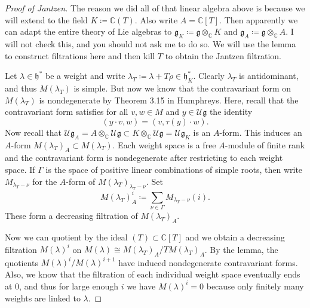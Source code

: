 \documentclass{amsart}
\theoremstyle{definition}
\theoremstyle{remark}
\theoremstyle{plain}
\theoremstyle{definition}
\theoremstyle{remark}
\newcommand{\C}{\mathbb{C}}
\newcommand{\U}{\mathcal{U}}
\newcommand{\g}{\mathfrak{g}}
\newcommand{\h}{\mathfrak{h}}
\newcommand{\1}{\mathbf{1}}
\newcommand{\2}{\mathbf{2}}
\newcommand{\3}{\mathbf{3}}
\begin{document}
\begin{proof}[Proof of Jantzen]
  The reason we did all of that linear algebra above is because we will extend to the field $K \coloneqq \C(T)$. Also write $A = \C[T]$. Then apparently we can adapt the entire theory of Lie algebras to $\g_K \coloneqq \g \otimes_{\C} K$ and $\g_A \coloneqq \g \otimes_{\C} A$. I will not check this, and you should not ask me to do so. We will use the lemma to construct filtrations here and then kill $T$ to obtain the Jantzen filtration.

  Let $\lambda \in \h^*$ be a weight and write $\lambda_T \coloneqq \lambda + T \rho \in \h^*_K$. Clearly $\lambda_T$ is antidominant, and thus $M(\lambda_T)$ is simple. But now we know that the contravariant form on $M(\lambda_T)$ is nondegenerate by Theorem 3.15 in Humphreys. Here, recall that the contravariant form satisfies for all $v, w \in M$ and $y \in \U \g$ the identity
  \[ (y \cdot v, w) = (v, \tau(y) \cdot w). \]
  Now recall that $\U \g_A = A \otimes_{\C} \U \g \subset K \otimes_{\C} \U \g = \U \g_K$ is an $A$-form. This induces an $A$-form $M(\lambda_T)_A \subset M(\lambda_T)$. Each weight space is a free $A$-module of finite rank and the contravariant form is nondegenerate after restricting to each weight space. If $\Gamma$ is the space of positive linear combinations of simple roots, then write $M_{\lambda_T - \nu}$ for the $A$-form of $M(\lambda_T)_{\lambda_T - \nu}$. Set
  \[ M(\lambda_T)_A^i \coloneqq \sum_{\nu \in \Gamma} M_{\lambda_T - \nu}(i). \]
  These form a decreasing filtration of $M(\lambda_T)_A$.

  Now we can quotient by the ideal $(T) \subset \C[T]$ and we obtain a decreasing filtration $M(\lambda)^i$ on $M(\lambda) \cong M(\lambda_T)_A / T M(\lambda_T)_A$. By the lemma, the quotients $M(\lambda)^i / M(\lambda)^{i+1}$ have induced nondegenerate contravariant forms. Also, we know that the filtration of each individual weight space eventually ends at $0$, and thus for large enough $i$ we have $M(\lambda)^i = 0$ because only finitely many weights are linked to $\lambda$.


\end{proof}
\end{document}
